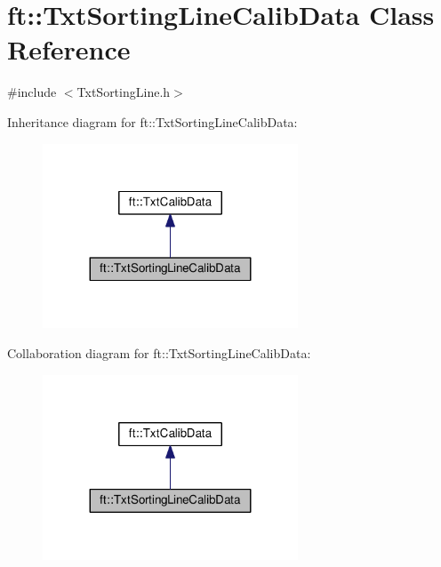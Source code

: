 \hypertarget{classft_1_1_txt_sorting_line_calib_data}{}\section{ft\+:\+:Txt\+Sorting\+Line\+Calib\+Data Class Reference}
\label{classft_1_1_txt_sorting_line_calib_data}


{\ttfamily \#include $<$Txt\+Sorting\+Line.\+h$>$}



Inheritance diagram for ft\+:\+:Txt\+Sorting\+Line\+Calib\+Data\+:
\nopagebreak
\begin{figure}[H]
\begin{center}
\leavevmode
\includegraphics[width=215pt]{classft_1_1_txt_sorting_line_calib_data__inherit__graph}
\end{center}
\end{figure}


Collaboration diagram for ft\+:\+:Txt\+Sorting\+Line\+Calib\+Data\+:
\nopagebreak
\begin{figure}[H]
\begin{center}
\leavevmode
\includegraphics[width=215pt]{classft_1_1_txt_sorting_line_calib_data__coll__graph}
\end{center}
\end{figure}
